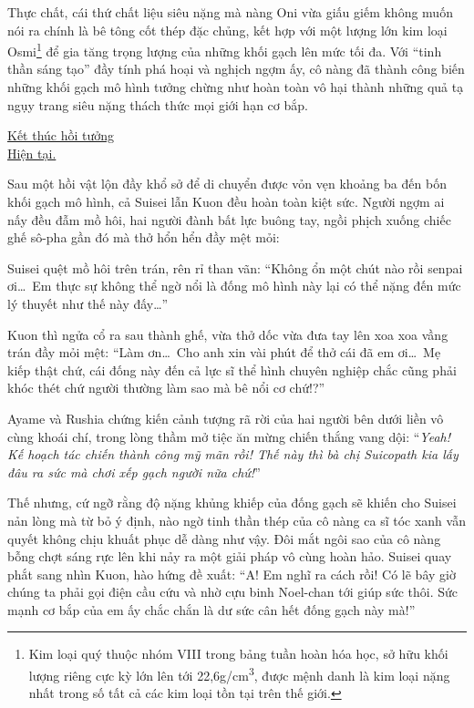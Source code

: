 \documentclass[../main.tex]{subfiles}
\begin{document}
Thực chất, cái thứ chất liệu siêu nặng mà nàng Oni vừa giấu giếm không muốn nói ra chính là bê tông cốt thép đặc chủng, kết hợp với một lượng lớn kim loại Osmi\footnote{Kim loại quý thuộc nhóm VIII trong bảng tuần hoàn hóa học, sở hữu khối lượng riêng cực kỳ lớn lên tới 22,6g/cm\textsuperscript{3}, được mệnh danh là kim loại nặng nhất trong số tất cả các kim loại tồn tại trên thế giới.} để gia tăng trọng lượng của những khối gạch lên mức tối đa. Với ``tinh thần sáng tạo'' đầy tính phá hoại và nghịch ngợm ấy, cô nàng đã thành công biến những khối gạch mô hình tưởng chừng như hoàn toàn vô hại thành những quả tạ ngụy trang siêu nặng thách thức mọi giới hạn cơ bắp.

\begin{center}
  \uline{Kết thúc hồi tưởng\\Hiện tại.}
\end{center}

Sau một hồi vật lộn đầy khổ sở để di chuyển được vỏn vẹn khoảng ba đến bốn khối gạch mô hình, cả Suisei lẫn Kuon đều hoàn toàn kiệt sức. Người ngợm ai nấy đều đẫm mồ hôi, hai người đành bất lực buông tay, ngồi phịch xuống chiếc ghế sô-pha gần đó mà thở hổn hển đầy mệt mỏi:

Suisei quệt mồ hôi trên trán, rên rỉ than vãn: ``Không ổn một chút nào rồi senpai ơi\dots\ Em thực sự không thể ngờ nổi là đống mô hình này lại có thể nặng đến mức lý thuyết như thế này đấy\dots''

Kuon thì ngửa cổ ra sau thành ghế, vừa thở dốc vừa đưa tay lên xoa xoa vầng trán đầy mỏi mệt: ``Làm ơn\dots\ Cho anh xin vài phút để thở cái đã em ơi\dots\ Mẹ kiếp thật chứ, cái đống này đến cả lực sĩ thể hình chuyên nghiệp chắc cũng phải khóc thét chứ người thường làm sao mà bê nổi cơ chứ!?''

Ayame và Rushia chứng kiến cảnh tượng rã rời của hai người bên dưới liền vô cùng khoái chí, trong lòng thầm mở tiệc ăn mừng chiến thắng vang dội: ``\textit{Yeah! Kế hoạch tác chiến thành công mỹ mãn rồi! Thế này thì bà chị Suicopath kia lấy đâu ra sức mà chơi xếp gạch người nữa chứ!}''

Thế nhưng, cứ ngỡ rằng độ nặng khủng khiếp của đống gạch sẽ khiến cho Suisei nản lòng mà từ bỏ ý định, nào ngờ tinh thần thép của cô nàng ca sĩ tóc xanh vẫn quyết không chịu khuất phục dễ dàng như vậy. Đôi mắt ngôi sao của cô nàng bỗng chợt sáng rực lên khi nảy ra một giải pháp vô cùng hoàn hảo. Suisei quay phắt sang nhìn Kuon, hào hứng đề xuất: ``A! Em nghĩ ra cách rồi! Có lẽ bây giờ chúng ta phải gọi điện cầu cứu và nhờ cựu binh Noel-chan tới giúp sức thôi. Sức mạnh cơ bắp của em ấy chắc chắn là dư sức cân hết đống gạch này mà!''
\end{document}
